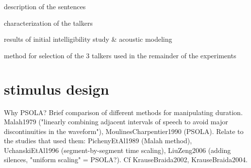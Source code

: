 \begin{itm}
	\item{description of the sentences}
	\item{characterization of the talkers}
	\item{results of initial intelligibility study \& acoustic modeling}
	\item{method for selection of the 3 talkers used in the remainder of the experiments}
\end{itm}


\section{stimulus design\label{sec:StimDesign}}
Why PSOLA?  Brief comparison of different methods for manipulating duration.  Malah1979 ("linearly combining adjacent intervals of speech to avoid major discontinuities in the waveform"), MoulinesCharpentier1990 (PSOLA).  Relate to the studies that used them: PichenyEtAl1989 (Malah method), UchanskiEtAl1996 (segment-by-segment time scaling), LiuZeng2006 (adding silences, "uniform scaling" = PSOLA?).  Cf KrauseBraida2002, KrauseBraida2004.

